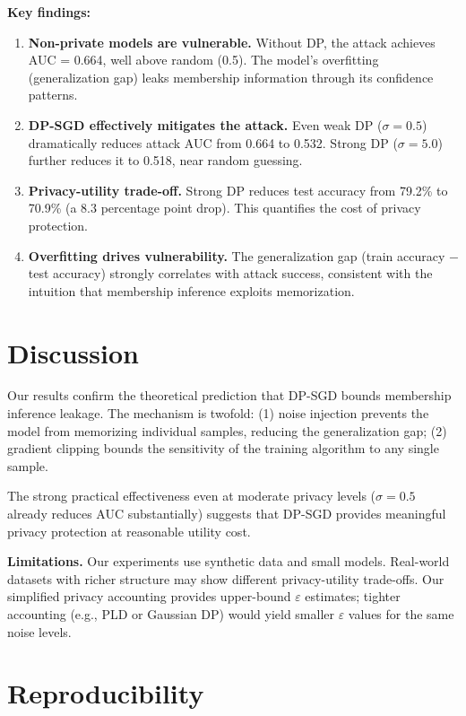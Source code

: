 \documentclass[11pt,a4paper]{article}
\begin{document}
\textbf{Key findings:}

\begin{enumerate}
  \item \textbf{Non-private models are vulnerable.} Without DP, the attack achieves AUC = 0.664, well above random (0.5). The model's overfitting (generalization gap) leaks membership information through its confidence patterns.

  \item \textbf{DP-SGD effectively mitigates the attack.} Even weak DP ($\sigma{=}0.5$) dramatically reduces attack AUC from 0.664 to 0.532. Strong DP ($\sigma{=}5.0$) further reduces it to 0.518, near random guessing.

  \item \textbf{Privacy-utility trade-off.} Strong DP reduces test accuracy from 79.2\% to 70.9\% (a 8.3 percentage point drop). This quantifies the cost of privacy protection.

  \item \textbf{Overfitting drives vulnerability.} The generalization gap (train accuracy $-$ test accuracy) strongly correlates with attack success, consistent with the intuition that membership inference exploits memorization.
\end{enumerate}

\section{Discussion}

Our results confirm the theoretical prediction that DP-SGD bounds membership inference leakage. The mechanism is twofold: (1) noise injection prevents the model from memorizing individual samples, reducing the generalization gap; (2) gradient clipping bounds the sensitivity of the training algorithm to any single sample.

The strong practical effectiveness even at moderate privacy levels ($\sigma{=}0.5$ already reduces AUC substantially) suggests that DP-SGD provides meaningful privacy protection at reasonable utility cost.

\textbf{Limitations.} Our experiments use synthetic data and small models. Real-world datasets with richer structure may show different privacy-utility trade-offs. Our simplified privacy accounting provides upper-bound $\varepsilon$ estimates; tighter accounting (e.g., PLD or Gaussian DP) would yield smaller $\varepsilon$ values for the same noise levels.

\section{Reproducibility}
\end{document}
